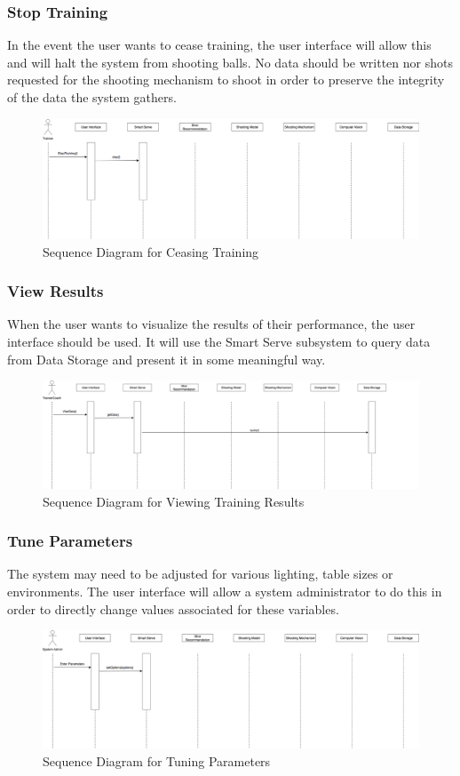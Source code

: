 \documentclass[11pt]{article}
\begin{document}
\subsubsection{Stop Training}
In the event the user wants to cease training, the user interface will allow this and will halt the system from shooting balls. No data should be written nor shots requested for the shooting mechanism to shoot in order to preserve the integrity of the data the system gathers.
\begin{figure}[H]
   \centering
   \includegraphics[width=\textwidth]{img/SequenceDiagram-Stop.png}
   \caption{Sequence Diagram for Ceasing Training}
   \label{fig:stop}
\end{figure}
\subsubsection{View Results}
When the user wants to visualize the results of their performance, the user interface should be used. It will use the Smart Serve subsystem to query data from Data Storage and present it in some meaningful way.
\begin{figure}[H]
   \centering
   \includegraphics[width=\textwidth]{img/SequenceDiagram-View.png}
   \caption{Sequence Diagram for Viewing Training Results}
   \label{fig:view}
\end{figure}
\subsubsection{Tune Parameters}
The system may need to be adjusted for various lighting, table sizes or environments. The user interface will allow a system administrator to do this in order to directly change values associated for these variables.
\begin{figure}[H]
   \centering
   \includegraphics[width=\textwidth]{img/SequenceDiagram-Tune.png}
   \caption{Sequence Diagram for Tuning Parameters}
   \label{fig:tune}
\end{figure}
\end{document}
